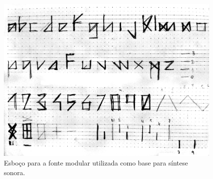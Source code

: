 




\begin{figure}[!ht]
   
       \includegraphics[width=1\linewidth]{pictures/audiotype_sketch}
   \caption{Esboço para a fonte modular utilizada como base para síntese sonora.}
    \label{fig:sketch}
 \end{figure}


%   

